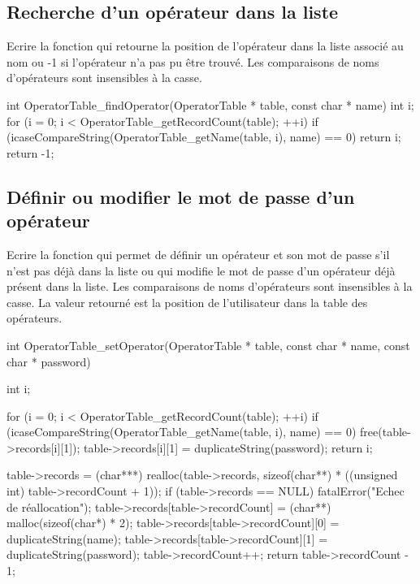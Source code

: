 \subsection{Recherche d'un opérateur dans la liste}

Ecrire la fonction  qui retourne la position de l'opérateur dans la liste associé au nom  ou -1 si l'opérateur n'a pas pu être trouvé. Les comparaisons de noms d'opérateurs sont insensibles à la casse.

\begin{csourcecorrection}
int OperatorTable_findOperator(OperatorTable * table, const char * name) {
    int i;
    for (i = 0; i < OperatorTable_getRecordCount(table); ++i)
        if (icaseCompareString(OperatorTable_getName(table, i), name) == 0)
            return i;
    return -1;
}
\end{csourcecorrection}

\subsection{Définir ou modifier le mot de passe d'un opérateur}

Ecrire la fonction  qui permet de définir un opérateur et son mot de passe s'il n'est pas déjà dans la liste ou qui modifie le mot de passe d'un opérateur déjà présent dans la liste. Les comparaisons de noms d'opérateurs sont insensibles à la casse. La valeur retourné est la position de l'utilisateur dans la table des opérateurs.

\begin{csourcecorrection}
int OperatorTable_setOperator(OperatorTable * table, const char * name,
        const char * password) {
    int i;

    for (i = 0; i < OperatorTable_getRecordCount(table); ++i)
        if (icaseCompareString(OperatorTable_getName(table, i), name) == 0) {
            free(table->records[i][1]);
            table->records[i][1] = duplicateString(password);
            return i;
        }

    table->records = (char***) realloc(table->records, sizeof(char**)
            * ((unsigned int) table->recordCount + 1));
    if (table->records == NULL)
        fatalError("Echec de réallocation");
    table->records[table->recordCount] = (char**) malloc(sizeof(char*) * 2);
    table->records[table->recordCount][0] = duplicateString(name);
    table->records[table->recordCount][1] = duplicateString(password);
    table->recordCount++;
    return table->recordCount - 1;
}
\end{csourcecorrection}

